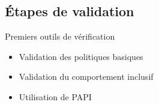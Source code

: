 \subsection{\'Etapes de validation}
\begin{frame}{Premiers outils de v\'erification}
  \begin{block}{}
    \begin{itemize}
      \item Validation des politiques basiques
      \item Validation du comportement inclusif
      \item Utilisation de PAPI
    \end{itemize}
  \end{block}
        
\end{frame}

